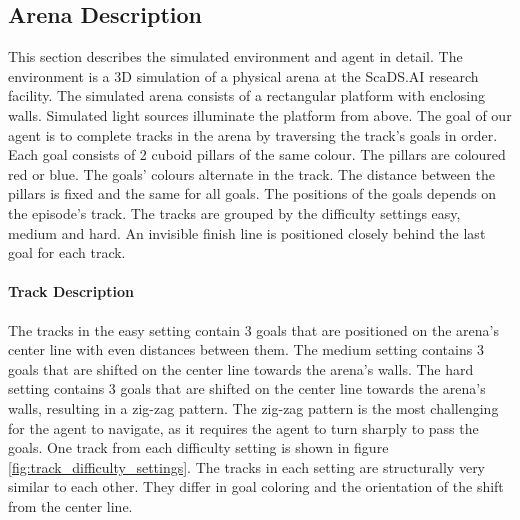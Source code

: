 \subsection{Arena Description}


This section describes the simulated environment and agent in detail. The environment is a 3D simulation of a physical arena at the ScaDS.AI research facility. The simulated arena consists of a rectangular platform with enclosing walls. Simulated light sources illuminate the platform from above.
The goal of our agent is to complete tracks in the arena by traversing the track's goals in order. Each goal consists of 2 cuboid pillars of the same colour. The pillars are coloured red or blue. The goals' colours alternate in the track. The distance between the pillars is fixed and the same for all goals. The positions of the goals depends on the episode's track. The tracks are grouped by the difficulty settings easy, medium and hard. An invisible finish line is positioned closely behind the last goal for each track.

\paragraph{Track Description}
The tracks in the easy setting contain 3 goals that are positioned on the arena's center line with even distances between them. The medium setting contains 3 goals that are shifted on the center line towards the arena's walls. The hard setting contains 3 goals that are shifted on the center line towards the arena's walls, resulting in a zig-zag pattern. The zig-zag pattern is the most challenging for the agent to navigate, as it requires the agent to turn sharply to pass the goals. One track from each difficulty setting is shown in figure \ref{fig:track_difficulty_settings}. The tracks in each setting are structurally very similar to each other. They differ in goal coloring and the orientation of the shift from the center line.


